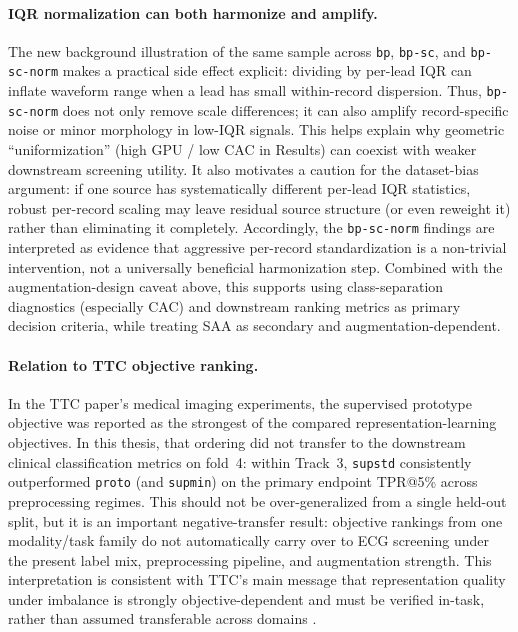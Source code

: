 \paragraph{IQR normalization can both harmonize and amplify.}
The new background illustration of the same sample across \texttt{bp}, \texttt{bp-sc}, and \texttt{bp-sc-norm} makes a practical side effect explicit: dividing by per-lead IQR can inflate waveform range when a lead has small within-record dispersion.
Thus, \texttt{bp-sc-norm} does not only remove scale differences; it can also amplify record-specific noise or minor morphology in low-IQR signals.
This helps explain why geometric ``uniformization'' (high GPU / low CAC in Results) can coexist with weaker downstream screening utility.
It also motivates a caution for the dataset-bias argument: if one source has systematically different per-lead IQR statistics, robust per-record scaling may leave residual source structure (or even reweight it) rather than eliminating it completely.
Accordingly, the \texttt{bp-sc-norm} findings are interpreted as evidence that aggressive per-record standardization is a non-trivial intervention, not a universally beneficial harmonization step.
Combined with the augmentation-design caveat above, this supports using class-separation diagnostics (especially CAC) and downstream ranking metrics as primary decision criteria, while treating SAA as secondary and augmentation-dependent.

\paragraph{Relation to TTC objective ranking.}
In the TTC paper's medical imaging experiments, the supervised prototype objective was reported as the strongest of the compared representation-learning objectives.
In this thesis, that ordering did not transfer to the downstream clinical classification metrics on fold~4: within Track~3, \texttt{supstd} consistently outperformed \texttt{proto} (and \texttt{supmin}) on the primary endpoint TPR@5\% across preprocessing regimes.
This should not be over-generalized from a single held-out split, but it is an important negative-transfer result: objective rankings from one modality/task family do not automatically carry over to ECG screening under the present label mix, preprocessing pipeline, and augmentation strength.
This interpretation is consistent with TTC's main message that representation quality under imbalance is strongly objective-dependent and must be verified in-task, rather than assumed transferable across domains \parencite{ttc_2025}.


